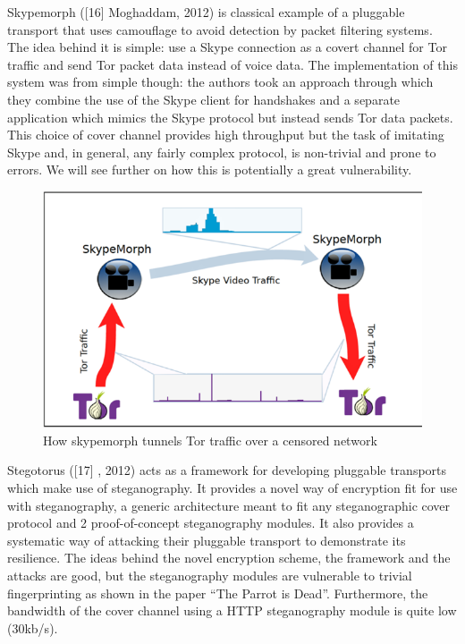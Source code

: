 \documentclass[11pt]{book} %
\begin{document}
Skypemorph ([16] Moghaddam, 2012) is classical example of a pluggable transport that uses camouflage to avoid detection by packet filtering systems. The idea behind it is simple: use a Skype connection as a covert channel for Tor traffic and send Tor packet data instead of voice data. The implementation of this system was from simple though: the authors took an approach through which they combine the use of the Skype client for handshakes and a separate application which mimics the Skype protocol but instead sends Tor data packets. This choice of cover channel provides high throughput but the task of imitating Skype and, in general, any fairly complex protocol, is non-trivial and prone to errors. We will see further on how this is potentially a great vulnerability.

\begin{figure}[h!]
\begin{center}
\includegraphics[scale=0.5]{skypemorph}
\end{center}
 \caption{How skypemorph tunnels Tor traffic over a censored network}
 \label{fig:skymorph}
 \end{figure}

Stegotorus ([17] , 2012) acts as a framework for developing pluggable transports which make use of steganography. It provides a novel way of encryption fit for use with steganography, a generic architecture meant to fit any steganographic cover protocol and 2 proof-of-concept steganography modules. It also provides a systematic way of attacking their pluggable transport to demonstrate its resilience. The ideas behind the novel encryption scheme, the framework and the attacks are good, but the steganography modules are vulnerable to trivial fingerprinting as shown in the paper “The Parrot is Dead”. Furthermore, the bandwidth of the cover channel using a HTTP steganography module is quite low (30kb/s).
\end{document}
